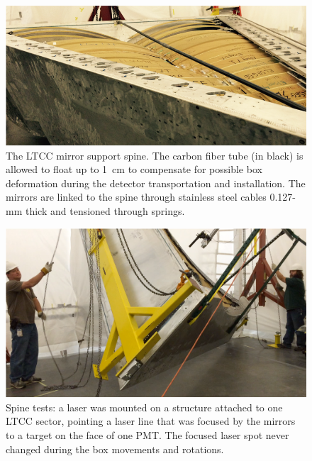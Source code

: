 \begin{figure}
	\centering
	\includegraphics[width=1.0\columnwidth,keepaspectratio]{img/spine.png}
	\caption{The LTCC mirror support spine. The carbon fiber tube (in black) is allowed to float up to 1~cm to compensate
             for possible box deformation during the detector transportation and installation. The mirrors are linked to
             the spine through stainless steel cables 0.127-mm thick and tensioned through springs.}
	\label{fig:spine}
\end{figure}

\begin{figure}
	\centering
	\includegraphics[width=1.0\columnwidth,keepaspectratio]{img/spineTest.png}
	\caption{Spine tests: a laser was mounted on a structure attached to one LTCC sector, pointing a laser line that was focused by the mirrors to a
            target on the face of one PMT. The focused laser spot never changed during the box movements and rotations.}
	\label{fig:spineTest}
\end{figure}





